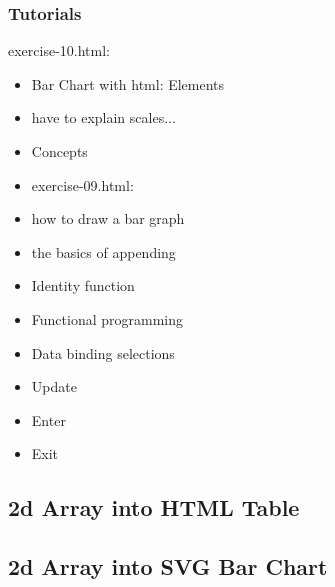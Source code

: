 \documentclass{beamer}
\begin{document}
\begin{frame}
\begin{frame}
    \frametitle{Tutorials}
    \begin{block}{exercise-10.html:}
        \begin{itemize}
        \item Bar Chart with html: Elements
        \item have to explain scales... 
        \item Concepts
        \item exercise-09.html:
        \item how to draw a bar graph
        \item the basics of appending 
        \item Identity function
        \item Functional programming
        \item Data binding selections
        \item Update
        \item Enter
        \item Exit
        \end{itemize}
    \end{block}
\end{frame}



\subsection{2d Array into HTML Table}




\subsection{2d Array into SVG Bar Chart}




\end{frame}
\end{document}
